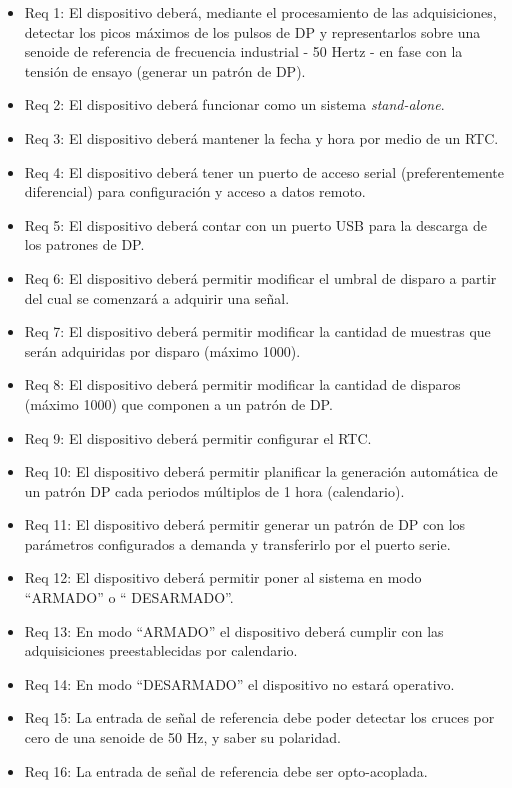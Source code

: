 \begin{itemize}
\item Req 1: El dispositivo deberá, mediante el procesamiento de las adquisiciones, detectar los picos máximos de los pulsos de DP y representarlos sobre una senoide de referencia de frecuencia industrial - 50 Hertz - en fase con la tensión de ensayo (generar un patrón de DP).
\item Req 2: El dispositivo deberá funcionar como un sistema \textit{stand-alone}.
\item Req 3: El dispositivo deberá mantener la fecha y hora por medio de un RTC.
\item Req 4: El dispositivo deberá tener un puerto de acceso serial (preferentemente diferencial) para configuración y acceso a datos remoto.
\item Req 5: El dispositivo deberá contar con un puerto USB para la descarga de los patrones de DP.
\item Req 6: El dispositivo deberá permitir modificar el umbral de disparo a partir del cual se comenzará a adquirir una señal.
\item Req 7: El dispositivo deberá permitir modificar la cantidad de muestras que serán adquiridas por disparo (máximo 1000).
\item Req 8: El dispositivo deberá permitir modificar la cantidad de disparos (máximo 1000) que componen a un patrón de DP.
\item Req 9: El dispositivo deberá permitir configurar el RTC.
\item Req 10: El dispositivo deberá permitir planificar la generación automática de un patrón DP cada periodos múltiplos de 1 hora (calendario).
\item Req 11: El dispositivo deberá permitir generar un patrón de DP con los parámetros configurados a demanda y transferirlo por el puerto serie.
\item Req 12: El dispositivo deberá permitir poner al sistema en modo “ARMADO” o “ DESARMADO”.
\item Req 13: En modo “ARMADO” el dispositivo deberá cumplir con las adquisiciones preestablecidas por calendario.
\item Req 14: En modo “DESARMADO” el dispositivo no estará operativo.
\item Req 15: La entrada de señal de referencia debe poder detectar los cruces por cero de una senoide de 50 Hz, y saber su polaridad.
\item Req 16: La entrada de señal de referencia debe ser opto-acoplada.

\end{itemize}

